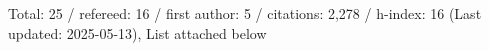 Total: 25 / refereed: 16 / first author: 5 / citations: 2,278 / h-index: 16 (Last updated: 2025-05-13), List attached below